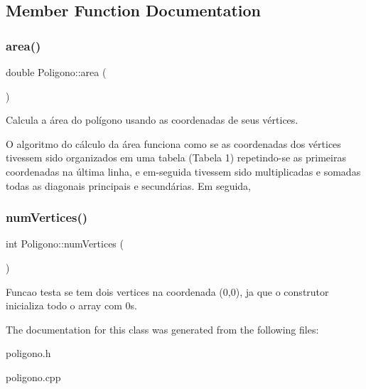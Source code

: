 \subsection{Member Function Documentation}
\mbox{\label{class_poligono_a7490b5dcca22558b603f6c1f735f3678}} 
\subsubsection{\texorpdfstring{area()}{area()}}
{\footnotesize\ttfamily double Poligono\+::area (\begin{DoxyParamCaption}{ }\end{DoxyParamCaption})}



Calcula a área do polígono usando as coordenadas de seus vértices. 

O algoritmo do cálculo da área funciona como se as coordenadas dos vértices tivessem sido organizados em uma tabela (Tabela 1) repetindo-\/se as primeiras coordenadas na última linha, e em-\/seguida tivessem sido multiplicadas e somadas todas as diagonais principais e secundárias. Em seguida,  \mbox{\label{class_poligono_a85c509901a031000fc3b9247de2a8d76}} 
\subsubsection{\texorpdfstring{num\+Vertices()}{numVertices()}}
{\footnotesize\ttfamily int Poligono\+::num\+Vertices (\begin{DoxyParamCaption}{ }\end{DoxyParamCaption})}



Funcao testa se tem dois vertices na coordenada (0,0), ja que o construtor inicializa todo o array com 0s. 



The documentation for this class was generated from the following files\+:\begin{DoxyCompactItemize}
\item 
poligono.\+h\item 
poligono.\+cpp\end{DoxyCompactItemize}
